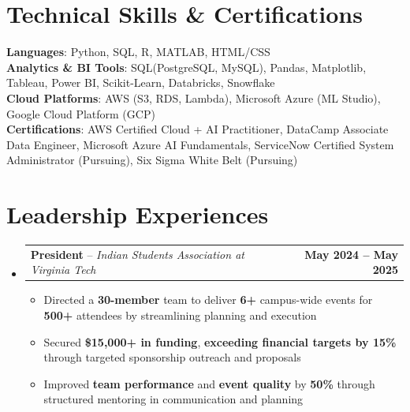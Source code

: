 \documentclass[letterpaper,11pt]{article}
\makeatletter
\newcommand{\resumeItem}[1]{
  \item\small{
    {#1 \vspace{-2pt}}
  }
}
\newcommand{\resumeSubheading}[4]{%
  \vspace{-2pt}\item
    \begin{tabular*}{1.0\textwidth}[t]{l@{\extracolsep{\fill}}r}
      \textbf{#1}{ -- }\textit{\small #3}%
      \ifthenelse{\equal{#4}{}}{}{, \textit{\small #4}}%
      & \textbf{\small #2} \\
    \end{tabular*}\vspace{-7pt}
}
\newcommand{\resumeSubHeadingListStart}{\begin{itemize}[leftmargin=0.0in, label={}]}
\newcommand{\resumeSubHeadingListEnd}{\end{itemize}}
\newcommand{\resumeItemListStart}{\begin{itemize}}
\newcommand{\resumeItemListEnd}{\end{itemize}\vspace{-5pt}}
\makeatother
\begin{document}
\section{Technical Skills \& Certifications}
    \begin{itemize}[leftmargin=0in, label={}]
        \small{\item{
            \textbf{Languages}{: Python, SQL, R, MATLAB, HTML/CSS} \\
            \textbf{Analytics \& BI Tools}{: SQL(PostgreSQL, MySQL), Pandas, Matplotlib, Tableau, Power BI, Scikit-Learn, Databricks, Snowflake} \\
            \textbf{Cloud Platforms}{: AWS (S3, RDS, Lambda), Microsoft Azure (ML Studio), Google Cloud Platform (GCP)} \\
            \textbf{Certifications}{: AWS Certified Cloud + AI Practitioner, DataCamp Associate Data Engineer, Microsoft Azure AI Fundamentals, ServiceNow Certified System Administrator (Pursuing), Six Sigma White Belt (Pursuing)} \\
        }}
    \end{itemize}
    \vspace{-16pt}

\section{Leadership Experiences}
    \resumeSubHeadingListStart
        \resumeSubheading
            {President}{May 2024 -- May 2025}
            {Indian Students Association at Virginia Tech}{Blacksburg, VA}
            \resumeItemListStart
                \resumeItem{Directed a \textbf{30-member} team to deliver \textbf{6+} campus-wide events for \textbf{500+} attendees by streamlining planning and execution}
                \resumeItem{Secured \textbf{\$15,000+ in funding}, \textbf{exceeding financial targets by 15\%} through targeted sponsorship outreach and proposals}
                \resumeItem{Improved \textbf{team performance} and \textbf{event quality} by \textbf{50\%} through structured mentoring in communication and planning}
            \resumeItemListEnd        
    \resumeSubHeadingListEnd

\end{document}

